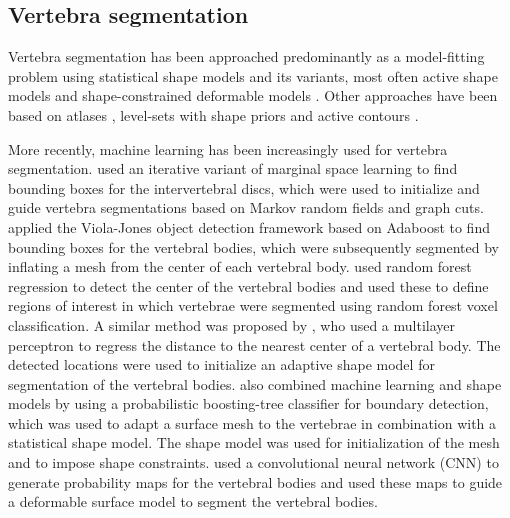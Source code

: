 \documentclass[authoryear,5p,final,times]{elsarticle}
\begin{document}
    \subsection{Vertebra segmentation}
    
    Vertebra segmentation has been approached predominantly as a model-fitting problem using statistical shape models and its variants, most often active shape models and shape-constrained deformable models \citep{CastroMateos2015,Ibragimov2014,Ibragimov2015,Kadoury2011,Kadoury2013,Klinder2009,Korez2015,Korez2016,Mastmeyer2006,Mirzaalian2013,Pereanez2015,Rasoulian2013,Stern2011,Suzani2015,Yang2017,Leventon2002}. Other approaches have been based on atlases \citep{Wang2015}, level-sets with shape priors \citep{Leventon2002,Lim2014} and active contours \citep{Hammernik2015,Athertya2016}.
    
    More recently, machine learning has been increasingly used for vertebra segmentation. \citet{Kelm2013} used an iterative variant of marginal space learning to find bounding boxes for the intervertebral discs, which were used to initialize and guide vertebra segmentations based on Markov random fields and graph cuts. \citet{Zukic2014} applied the Viola-Jones object detection framework based on Adaboost to find bounding boxes for the vertebral bodies, which were subsequently segmented by inflating a mesh from the center of each vertebral body. \citet{Chu2015} used random forest regression to detect the center of the vertebral bodies and used these to define regions of interest in which vertebrae were segmented using random forest voxel classification. A similar method was proposed by \citet{Suzani2015}, who used a multilayer perceptron to regress the distance to the nearest center of a vertebral body. The detected locations were used to initialize an adaptive shape model for segmentation of the vertebral bodies. \citet{Mirzaalian2013} also combined machine learning and shape models by using a probabilistic boosting-tree classifier for boundary detection, which was used to adapt a surface mesh to the vertebrae in combination with a statistical shape model. The shape model was used for initialization of the mesh and to impose shape constraints. \citet{Korez2016} used a convolutional neural network (CNN) to generate probability maps for the vertebral bodies and used these maps to guide a deformable surface model to segment the vertebral bodies.
    
\end{document}
